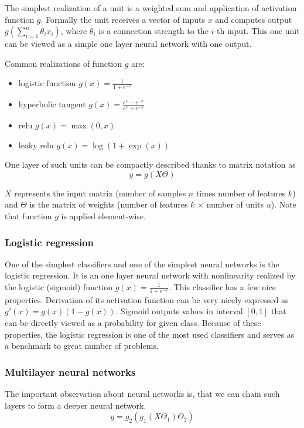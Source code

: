     The simplest realization of a unit is a weighted sum and application of activation function $g$. 
    Formally the unit receives a vector of inputs $x$ and computes output $g(\sum_{i=1}^n \theta_i x_i)$, 
    where $\theta_i$ is a connection strength to the $i$-th input.
    This one unit can be viewed as a simple one layer neural network with one output.
    
    Common realizations of function $g$ are: 
    \begin{itemize}
        \item logistic function $g(x) = \frac{1}{1+e^{-x}}$
        \item hyperbolic tangent $g(x)=\frac{e^x-e^{-x}}{e^x+e^{-x}}$
        \item relu $g(x) = \max(0,x)$ 
        \item leaky relu $g(x)=\log(1+\exp(x))$
    \end{itemize}
    
    One layer of such units can be compactly described thanks to matrix notation as
    $$y=g(X \Theta)$$
    
    $X$ represents the input matrix (number of samples $n$ times number of features $k$) and $\Theta$ is the matrix of weights (number of features $k$ $\times$ number of units $u$). Note that function $g$ is applied element-wise.
    
    \subsubsection{Logistic regression}
    One of the simplest classifiers and one of the simplest neural networks is the logistic regression.
    It is an one layer neural network with nonlinearity realized by the logistic (sigmoid) function $g(x) = \frac{1}{1+e^{-x}}$.
    This classifier has a few nice properties. 
    Derivation of its activation function can be very nicely expressed as $g'(x) = g(x)(1-g(x))$.
    Sigmoid outputs values in interval $[0,1]$ that can be directly viewed as a probability for given class.
    Because of these properties, the logistic regression is one of the most used classifiers and serves as a benchmark to great number of problems.
    
    \subsubsection{Multilayer neural networks}
    The important observation about neural networks is, that we can chain such layers to form a deeper neural network.
    $$y=g_2(g_1(X \Theta_1) \Theta_2)$$
    
